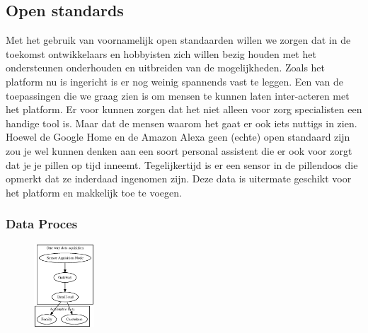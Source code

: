 \documentclass{below-ext}
\begin{document}
\subsection{Open standards}
Met het gebruik van voornamelijk open standaarden willen we zorgen dat in de toekomst ontwikkelaars en hobbyisten zich willen bezig houden met het ondersteunen onderhouden en uitbreiden van de mogelijkheden. Zoals het platform nu is ingericht is er nog weinig spannends vast te leggen. Een van de toepassingen die we graag zien is om mensen te kunnen laten inter-acteren met het platform. Er voor kunnen zorgen dat het niet alleen voor zorg specialisten een handige tool is. Maar dat de mensen waarom het gaat er ook iets nuttigs in zien. Hoewel de Google Home en de Amazon Alexa geen (echte) open standaard zijn zou je wel kunnen denken aan een soort personal assistent die er ook voor zorgt dat je je pillen op tijd inneemt. Tegelijkertijd is er een sensor in de pillendoos die opmerkt dat ze inderdaad ingenomen zijn. Deze data is uitermate geschikt voor het platform en makkelijk toe te voegen.
\subsubsection{Data Proces}
\begin{figure}
\center
\includegraphics[width=0.2\textwidth]{process}
\end{figure}

\end{document}
